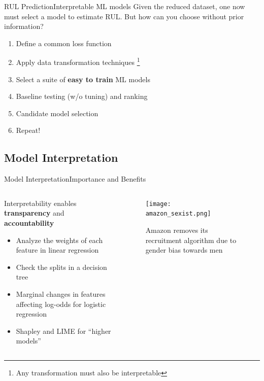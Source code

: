 \documentclass{beamer}
\begin{document}
            \begin{frame}{RUL Prediction}{Interpretable ML models}
                Given the reduced dataset, one now must select a model to estimate RUL. But how can you choose without prior information?
                \begin{enumerate}
                    \item Define a common loss function
                    \item Apply data transformation techniques \footnote{Any transformation must also be interpretable}
                    \item Select a suite of \textbf{easy to train} ML models
                    \item Baseline testing (w/o tuning) and ranking
                    \item Candidate model selection
                    \item Repeat!
                \end{enumerate}
            \end{frame}

        \subsection{Model Interpretation}
            \begin{frame}{Model Interpretation}{Importance and Benefits}

                \begin{columns}
                    \begin{column}{0.5\textwidth}
                        Interpretability enables \textbf{transparency} and \textbf{accountability}
                        \begin{itemize}
                            \item Analyze the weights of each feature in linear regression
                            \item Check the splits in a decision tree
                            \item Marginal changes in features affecting log-odds for logistic regression
                            \item Shapley and LIME for \enquote{higher models}
                        \end{itemize}
                    \end{column}
                    \begin{column}{0.5\textwidth}
                        \begin{figure}[!htbp]
                            \centering
                            \texttt{[image: amazon\_sexist.png]}
                            \caption{Amazon removes its recruitment algorithm due to gender bias towards men \cite{reporter-2018}}
                        \end{figure}
                    \end{column}
                \end{columns}
            \end{frame}
\end{document}
